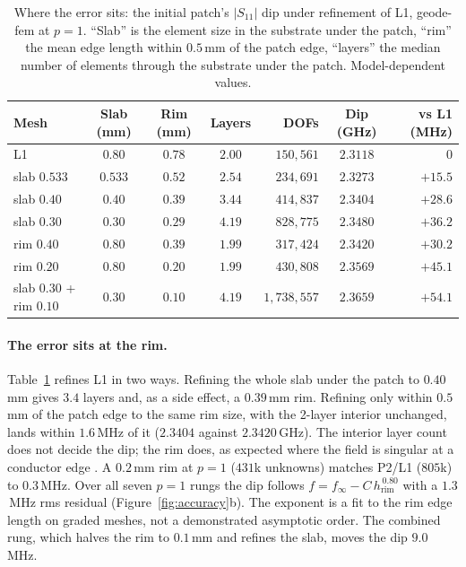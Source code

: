 \documentclass{anvil-paper}
\newcommand{\PL}{P2/L1}
\begin{document}
\begin{table}[t]
  \centering
  \caption{Where the error sits: the initial patch's $|S_{11}|$ dip under
  refinement of L1, geode-fem at $p = 1$. ``Slab'' is the element size in
  the substrate under the patch, ``rim'' the mean edge length within
  $0.5$\,mm of the patch edge, ``layers'' the median number of elements
  through the substrate under the patch. Model-dependent values.}
  \label{tab:x1}
  \small
  \begin{tabular}{@{}l c c c r c r@{}}
    \toprule
    Mesh & Slab (mm) & Rim (mm) & Layers & DOFs & Dip (GHz) & vs L1 (MHz) \\
    \midrule
    L1 & $0.80$ & $0.78$ & $2.00$ & $150{,}561$ & $2.3118$ & $0$ \\
    slab $0.533$ & $0.533$ & $0.52$ & $2.54$ & $234{,}691$ & $2.3273$ & $+15.5$ \\
    slab $0.40$ & $0.40$ & $0.39$ & $3.44$ & $414{,}837$ & $2.3404$ & $+28.6$ \\
    slab $0.30$ & $0.30$ & $0.29$ & $4.19$ & $828{,}775$ & $2.3480$ & $+36.2$ \\
    rim $0.40$ & $0.80$ & $0.39$ & $1.99$ & $317{,}424$ & $2.3420$ & $+30.2$ \\
    rim $0.20$ & $0.80$ & $0.20$ & $1.99$ & $430{,}808$ & $2.3569$ & $+45.1$ \\
    slab $0.30$ + rim $0.10$ & $0.30$ & $0.10$ & $4.19$ & $1{,}738{,}557$ & $2.3659$ & $+54.1$ \\
    \bottomrule
  \end{tabular}
\end{table}

\paragraph{The error sits at the rim.}
Table~\ref{tab:x1} refines L1 in two ways. Refining the whole slab under the
patch to $0.40$\,mm gives $3.4$ layers and, as a side effect, a $0.39$\,mm
rim. Refining only within $0.5$\,mm of the patch edge to the same rim size,
with the 2-layer interior unchanged, lands within $1.6$\,MHz of it
($2.3404$ against $2.3420$\,GHz). The interior layer count does not decide
the dip; the rim does, as expected where the field is singular at a
conductor edge \citep{meixner1972behavior}. A $0.2$\,mm rim at $p = 1$
($431$k unknowns) matches \PL{} ($805$k) to $0.3$\,MHz. Over all seven
$p = 1$ rungs the dip follows $f = f_\infty - C\,h_{\mathrm{rim}}^{\,0.80}$
with a $1.3$\,MHz rms residual (Figure~\ref{fig:accuracy}b). The exponent is
a fit to the rim edge length on graded meshes, not a demonstrated
asymptotic order. The combined rung, which halves the rim to $0.1$\,mm and
refines the slab, moves the dip $9.0$\,MHz.
\end{document}

